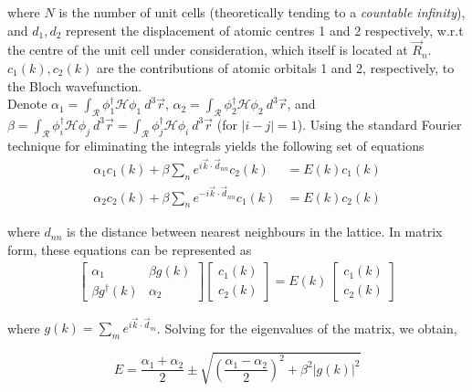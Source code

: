 where $N$ is the number of unit cells (theoretically tending to a \textit{countable infinity}), and $d_{1}, d_{2}$ represent the displacement of atomic centres 1 and 2 respectively, w.r.t the centre of the unit cell under consideration, which itself is located at $\vec{R}_{n}$. $c_{1}(k), c_{2}(k)$ are the contributions of atomic orbitals 1 and 2, respectively, to the Bloch wavefunction. \\

Denote $\alpha_{1} = \int_{\mathcal{R}} \phi_{1}^{\dagger}\mathcal{H}\phi_{1}\: d^{3}\vec{r}$, $\alpha_{2} = \int_{\mathcal{R}} \phi_{2}^{\dagger}\mathcal{H}\phi_{2}\: d^{3}\vec{r}$, and $\beta = \int_{\mathcal{R}} \phi_{i}^{\dagger}\mathcal{H}\phi_{j}\: d^{3}\vec{r} = \int_{\mathcal{R}} \phi_{j}^{\dagger}\mathcal{H}\phi_{i}\: d^{3}\vec{r}$ (for $|i-j| = 1$). Using the standard Fourier technique for eliminating the integrals yields the following set of equations
\begin{equation*}
    \begin{aligned}
        \alpha_{1} c_{1}(k) + \beta \sum_{n}e^{i\vec{k}\cdot \vec{d}_{nn}} c_{2}(k) &= E(k) c_{1}(k) \\
        \alpha_{2} c_{2}(k) + \beta \sum_{n}e^{-i\vec{k}\cdot \vec{d}_{nn}} c_{1}(k) &= E(k) c_{2}(k)
    \end{aligned}
\end{equation*}

where $d_{nn}$ is the distance between nearest neighbours in the lattice. In matrix form, these equations can be represented as
\begin{gather*}
    \begin{bmatrix}
        \alpha_{1} & \beta g(k) \\ \beta g^{\dagger}(k) & \alpha_{2}
    \end{bmatrix}
    \begin{bmatrix}
        c_{1}(k) \\ c_{2}(k)
    \end{bmatrix}
    = E(k) \:
    \begin{bmatrix}
        c_{1}(k) \\ c_{2}(k)
    \end{bmatrix}
\end{gather*}  

where $g(k) = \sum_{m}e^{i\vec{k}\cdot \vec{d}_{m}}$. Solving for the eigenvalues of the matrix, we obtain, 

\begin{equation}
    E = \frac{\alpha_{1} + \alpha_{2}}{2} \pm \sqrt{\left(\frac{\alpha_{1} - \alpha_{2}}{2}\right)^{2} + \beta^{2}|g(k)|^{2}}
\end{equation}

